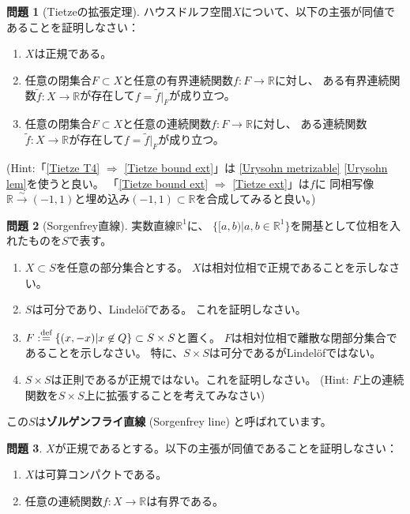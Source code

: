 \documentclass[uplatex]{jsarticle}
\theoremstyle{definition}
\newtheorem{prob}[prob]{問題}
\newcommand{\dfn}{:\overset{\mbox{{\scriptsize def}}}{=}}
\newcommand{\R}{\mathbb{R}}
\begin{document}
\begin{prob}[Tietzeの拡張定理]
  ハウスドルフ空間\(X\)について、以下の主張が同値であることを証明しなさい：
  \begin{enumerate}
    \item \label{Tietze T4}
    \(X\)は正規である。
    \item \label{Tietze bound ext}
    任意の閉集合\(F\subset X\)と任意の有界連続関数\(f:F\to \R\)に対し、
    ある有界連続関数\(\tilde{f}:X\to \R\)が存在して\(f=\tilde{f}|_F\)が成り立つ。
    \item \label{Tietze ext}
    任意の閉集合\(F\subset X\)と任意の連続関数\(f:F\to \R\)に対し、
    ある連続関数\(\tilde{f}:X\to \R\)が存在して\(f=\tilde{f}|_F\)が成り立つ。
  \end{enumerate}
  (Hint:「\ref{Tietze T4} \(\Rightarrow\) \ref{Tietze bound ext}」は
  \autoref{Urysohn metrizable} \ref{Urysohn lem}を使うと良い。
  「\ref{Tietze bound ext} \(\Rightarrow\) \ref{Tietze ext}」は\(f\)に
  同相写像\(\R\xrightarrow{\sim} (-1,1)\)と埋め込み\((-1,1)\subset \R\)を合成してみると良い。)
\end{prob}




\begin{prob}[Sorgenfrey直線]\label{Sorgenfrey}
  実数直線\(\R^1\)に、
  \(\{[a,b) | a,b\in \R^1\}\)を開基として位相を入れたものを\(S\)で表す。
  \begin{enumerate}
    \item
    \(X\subset S\)を任意の部分集合とする。
    \(X\)は相対位相で正規であることを示しなさい。
    \item
    \(S\)は可分であり、Lindel\"{o}fである。
    これを証明しなさい。
    \item \label{Sorgenfrey line sep not Lind}
    \(F\dfn \{(x,-x)|x\not\in Q\}\subset S\times S\)と置く。
    \(F\)は相対位相で離散な閉部分集合であることを示しなさい。
    特に、\(S\times S\)は可分であるがLindel\"{o}fではない。
    \item
    \(S\times S\)は正則であるが正規ではない。これを証明しなさい。
    (Hint: \(F\)上の連続関数を\(S\times S\)上に拡張することを考えてみなさい)
  \end{enumerate}
  この\(S\)は\textbf{ゾルゲンフライ直線} (Sorgenfrey line) と呼ばれています。
\end{prob}




\begin{prob}\label{countably cpt and pseudo cpt}
  \(X\)が正規であるとする。以下の主張が同値であることを証明しなさい：
  \begin{enumerate}
    \item
    \(X\)は可算コンパクトである。
    \item
    任意の連続関数\(f:X\to \R\)は有界である。
  \end{enumerate}
\end{prob}
\end{document}
